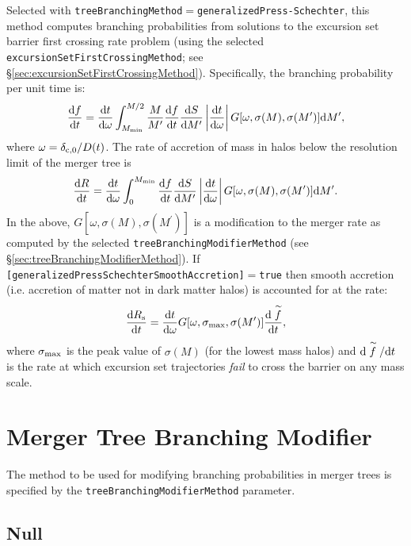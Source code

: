 Selected with {\tt treeBranchingMethod}$=${\tt generalizedPress-Schechter}, this method computes branching probabilities from solutions to the excursion set barrier first crossing rate problem (using the selected {\tt excursionSetFirstCrossingMethod}; see \S\ref{sec:excursionSetFirstCrossingMethod}). Specifically, the branching probability per unit time is:
\begin{equation}
 {\d f \over \d t} = {{\rm d} t \over {\rm d}\omega} \int_{M_{\rm min}}^{M/2} {M \over M^\prime} {\d f \over \d t} {\d S \over \d M^\prime} \left| {\d t \over \d \omega}\right| G[\omega,\sigma(M),\sigma(M^\prime)] \d M^\prime,
\end{equation}
where $\omega = \delta_{\rm c,0}/D(t)$. The rate of accretion of mass in halos below the resolution limit of the merger tree is
\begin{equation}
 {\d R \over \d t} =  {{\rm d} t \over {\rm d}\omega} \int_0^{M_{\rm min}} {\d f \over \d t} {\d S \over \d M^\prime} \left| {\d t \over \d \omega}\right| G[\omega,\sigma(M),\sigma(M^\prime)] \d M^\prime.
\end{equation}
In the above, $G[\omega,\sigma(M),\sigma(M^\prime)]$ is a modification to the merger rate as computed by the selected {\tt treeBranchingModifierMethod} (see \S\ref{sec:treeBranchingModifierMethod}). If {\tt [generalizedPressSchechterSmoothAccretion]}$=${\tt true} then smooth accretion (i.e. accretion of matter not in dark matter halos) is accounted for at the rate:
\begin{equation}
 {\d R_{\rm s} \over \d t} =  {{\rm d} t \over {\rm d}\omega} G[\omega,\sigma_{\rm max},\sigma(M^\prime)] {\d \stackrel{\sim}{f} \over \d t},
\end{equation}
where $\sigma_{\rm max}$ is the peak value of $\sigma(M)$ (for the lowest mass halos) and $\d \stackrel{\sim}{f}/\d t$ is the rate at which excursion set trajectories \emph{fail} to cross the barrier on any mass scale.


\section{Merger Tree Branching Modifier}

The method to be used for modifying branching probabilities in merger trees is specified by the {\tt treeBranchingModifierMethod} parameter.

\subsection{Null}

